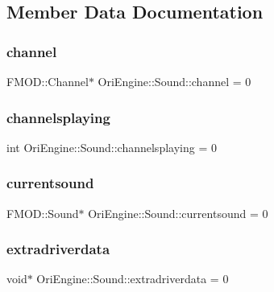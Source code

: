 \subsection{Member Data Documentation}
\hypertarget{class_ori_engine_1_1_sound_a963e5638fef3106b3715130cb1e75f82}{}\label{class_ori_engine_1_1_sound_a963e5638fef3106b3715130cb1e75f82} 
\subsubsection{\texorpdfstring{channel}{channel}}
{\footnotesize\ttfamily F\+M\+O\+D\+::\+Channel$\ast$ Ori\+Engine\+::\+Sound\+::channel = 0}

\hypertarget{class_ori_engine_1_1_sound_a2836bbe85bb423313d4e5c6a8c591a44}{}\label{class_ori_engine_1_1_sound_a2836bbe85bb423313d4e5c6a8c591a44} 
\subsubsection{\texorpdfstring{channelsplaying}{channelsplaying}}
{\footnotesize\ttfamily int Ori\+Engine\+::\+Sound\+::channelsplaying = 0}

\hypertarget{class_ori_engine_1_1_sound_a37c74fe1bf0dab55211c78a432337627}{}\label{class_ori_engine_1_1_sound_a37c74fe1bf0dab55211c78a432337627} 
\subsubsection{\texorpdfstring{currentsound}{currentsound}}
{\footnotesize\ttfamily F\+M\+O\+D\+::\+Sound$\ast$ Ori\+Engine\+::\+Sound\+::currentsound = 0}

\hypertarget{class_ori_engine_1_1_sound_a171548ea8d26a1075cd65505688186d2}{}\label{class_ori_engine_1_1_sound_a171548ea8d26a1075cd65505688186d2} 
\subsubsection{\texorpdfstring{extradriverdata}{extradriverdata}}
{\footnotesize\ttfamily void$\ast$ Ori\+Engine\+::\+Sound\+::extradriverdata = 0}

